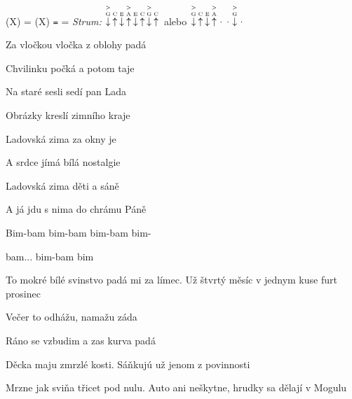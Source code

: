 \begin{song}


 \quad
(X) = \textbf{} \quad
(X) \texttt{=} \textbf{} \quad
{} = \textbf{} \quad
\textit{Strum:} $\PluckDown{> G}\PluckUp{C}\PluckDown{E}\PluckUp{> A}\PluckDown{E}\PluckUp{C}\PluckDown{> G}\PluckUp{C}$ alebo
$\PluckDown{> G}\PluckUp{C}\PluckDown{E}\PluckUp{> A}\Miss\Miss\PluckDown{> G}\Miss$ \quad

\large


\normalsize

 Za vločkou vločka  z oblohy padá \par
{} Chvilinku počká  a potom taje \par
{} Na staré sesli  sedí pan Lada \par
{} Obrázky kreslí  zimního kraje \par

\bigskip

\begin{chorusbox}{\Refren}
 Ladovská zima  za okny je \par
{} A srdce jímá bílá nostalgie \par
{} Ladovská zima  děti a sáně \par
{} A já jdu s nima  do chrámu Páně \par
{} Bim-bam bim-bam bim-bam bim-\par
{}bam... bim-bam bim \par
\end{chorusbox}

\bigskip

 To mokré bílé svinstvo padá mi za límec.  Už štvrtý měsíc v jednym kuse furt prosinec \par
{}   Večer to odhážu,  namažu záda \par
{} Ráno se vzbudim a zas kurva padá   \par

\bigskip

 Děcka maju zmrzlé kosti.   Sáňkujú už jenom z povinnosti  \par
{} Mrzne jak sviňa  třicet pod nulu.  Auto ani neškytne,  hrudky sa dělají v Mogulu \par


\end{song}
